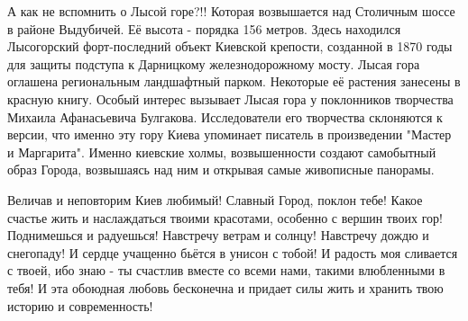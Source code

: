 А как не вспомнить о Лысой горе?!! Которая возвышается над Столичным шоссе в
районе Выдубичей. Её высота - порядка 156 метров. Здесь находился Лысогорский
форт-последний объект Киевской крепости, созданной в 1870 годы для защиты
подступа к Дарницкому железнодорожному мосту. Лысая гора оглашена региональным
ландшафтный парком. Некоторые её растения занесены в красную книгу. Особый
интерес вызывает Лысая гора у поклонников творчества Михаила Афанасьевича
Булгакова. Исследователи его творчества склоняются к версии, что именно эту
гору Киева упоминает писатель в произведении "Мастер и Маргарита". Именно
киевские холмы, возвышенности создают самобытный образ Города, возвышаясь над
ним и открывая самые живописные панорамы. 

Величав и неповторим Киев любимый! Славный Город, поклон тебе! Какое счастье
жить и наслаждаться твоими красотами, особенно с вершин твоих гор! Поднимешься
и радуешься! Навстречу ветрам и солнцу!  Навстречу дождю и снегопаду! И сердце
учащенно бьётся в унисон с тобой! И радость моя сливается с твоей, ибо знаю -
ты счастлив вместе со всеми нами, такими влюбленными в тебя! И эта обоюдная
любовь бесконечна и придает силы жить и хранить твою историю и современность!
